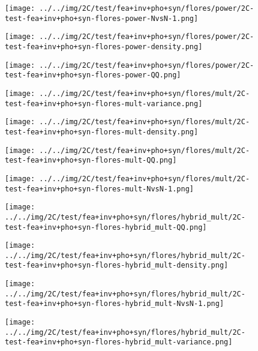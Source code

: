 \begin{figure}[H]
\centering	\texttt{[image: ../../img/2C/test/fea+inv+pho+syn/flores/power/2C-test-fea+inv+pho+syn-flores-power-NvsN-1.png]}
\end{figure}
\begin{figure}[H]
\centering	\texttt{[image: ../../img/2C/test/fea+inv+pho+syn/flores/power/2C-test-fea+inv+pho+syn-flores-power-density.png]}
\end{figure}
\begin{figure}[H]
\centering	\texttt{[image: ../../img/2C/test/fea+inv+pho+syn/flores/power/2C-test-fea+inv+pho+syn-flores-power-QQ.png]}
\end{figure}
\begin{figure}[H]
\centering	\texttt{[image: ../../img/2C/test/fea+inv+pho+syn/flores/mult/2C-test-fea+inv+pho+syn-flores-mult-variance.png]}
\end{figure}
\begin{figure}[H]
\centering	\texttt{[image: ../../img/2C/test/fea+inv+pho+syn/flores/mult/2C-test-fea+inv+pho+syn-flores-mult-density.png]}
\end{figure}
\begin{figure}[H]
\centering	\texttt{[image: ../../img/2C/test/fea+inv+pho+syn/flores/mult/2C-test-fea+inv+pho+syn-flores-mult-QQ.png]}
\end{figure}
\begin{figure}[H]
\centering	\texttt{[image: ../../img/2C/test/fea+inv+pho+syn/flores/mult/2C-test-fea+inv+pho+syn-flores-mult-NvsN-1.png]}
\end{figure}
\begin{figure}[H]
\centering	\texttt{[image: ../../img/2C/test/fea+inv+pho+syn/flores/hybrid\_mult/2C-test-fea+inv+pho+syn-flores-hybrid\_mult-QQ.png]}
\end{figure}
\begin{figure}[H]
\centering	\texttt{[image: ../../img/2C/test/fea+inv+pho+syn/flores/hybrid\_mult/2C-test-fea+inv+pho+syn-flores-hybrid\_mult-density.png]}
\end{figure}
\begin{figure}[H]
\centering	\texttt{[image: ../../img/2C/test/fea+inv+pho+syn/flores/hybrid\_mult/2C-test-fea+inv+pho+syn-flores-hybrid\_mult-NvsN-1.png]}
\end{figure}
\begin{figure}[H]
\centering	\texttt{[image: ../../img/2C/test/fea+inv+pho+syn/flores/hybrid\_mult/2C-test-fea+inv+pho+syn-flores-hybrid\_mult-variance.png]}
\end{figure}
